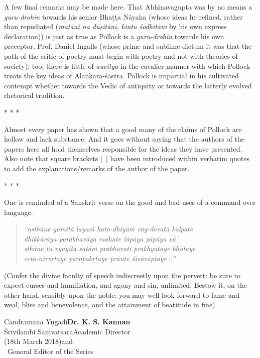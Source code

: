 A few final remarks may be made here. That Abhinavagupta was by no means a \textsl{guru-drohin} towards his senior Bhaṭṭa Nāyaka (whose ideas he refined, rather than repudiated (\textsl{matāni na dūṣitāni, kintu śodhitāni} by his own express declaration)) is just as true as Pollock is a \textsl{guru-drohin} towards his own preceptor, Prof. Daniel Ingalls (whose prime and sublime dictum it was that the path of the critic of poetry must begin with poetry and not with theories of society); too, there is little of \textsl{aucitya} in the cavalier manner with which Pollock treats the key ideas of Alaṅkāra-śāstra. Pollock is impartial in his cultivated contempt whether towards the Vedic of antiquity or towards the latterly evolved rhetorical tradition.
\begin{center}
* * *
\end{center}
Almost every paper has shown that a good many of the claims of Pollock are hollow and lack substance. And it goes without saying that the authors of the papers here all hold themselves responsible for the ideas they have presented. Also note that square brackets [~] have been introduced within verbatim quotes to add the explanations/remarks of the author of the paper.
\begin{center}
* * *
\end{center}
One is reminded of a Sanskrit verse on the good and bad uses of a command over language.
\begin{quote}
\textsl{“asthāne gamitā layaṁ hata-dhiyāṁ vāg-devatā kalpate}\\[2pt]
\phantom{aaaaaa}\textsl{dhikkārāya parābhavāya mahate tāpāya pāpāya vā} |\\[2pt]
\textsl{sthāne tu vyayitā satāṁ prabhavati prakhyātaye bhūtaye}\\[2pt]
\phantom{aaaaaa}\textsl{ceto-nirvṛtaye paropakṛtaye prānte śivāvāptaye} ||”
\end{quote}

\begin{normalmyquote}
(Confer the divine faculty of speech indiscreetly upon the pervert: be sure to expect curses and humiliation, and agony and sin, unlimited. Bestow it, on the other hand, sensibly upon the noble: you may well look forward to fame and weal, bliss and benevolence, and the attainment of beatitude in fine).
\end{normalmyquote}

\bigskip
\noindent
Cāndramāna Yugādi\hfill {\bf Dr. K. S. Kannan}\\
Śrīvilambi Saṁvatsara\hfill Academic Director\\
(18th March 2018)\hfill	and\\
~\phantom{a}\hfill  General Editor of the Series

